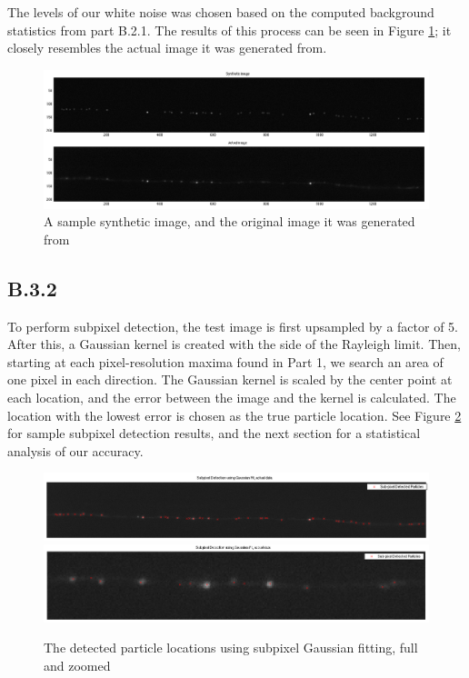 \documentclass{article}
\begin{document}
The levels of our white noise was chosen based on the computed background statistics from part B.2.1. The results of this process can be seen in Figure \ref{fig:syntheticImage}; it closely resembles the actual image it was generated from.

\begin{figure}[H]
\centering
\includegraphics[width=16cm]{figures/synthetic_image.png}
\caption{A sample synthetic image, and the original image it was generated from}
\label{fig:syntheticImage}
\end{figure}


\subsection*{B.3.2}

To perform subpixel detection, the test image is first upsampled by a factor of 5. After this, a Gaussian kernel is created with the side of the Rayleigh limit. Then, starting at each pixel-resolution maxima found in Part 1, we search an area of one pixel in each direction. The Gaussian kernel is scaled by the center point at each location, and the error between the image and the kernel is calculated. The location with the lowest error is chosen as the true particle location. See Figure \ref{fig:subpixelReal} for sample subpixel detection results, and the next section for a statistical analysis of our accuracy.

\begin{figure}[H]
\centering
\includegraphics[width=16cm]{figures/subpixel_real_full.png}
\includegraphics[width=16cm]{figures/subpixel_real_zoom.png}
\caption{The detected particle locations using subpixel Gaussian fitting, full and zoomed}
\label{fig:subpixelReal}
\end{figure}
\end{document}
